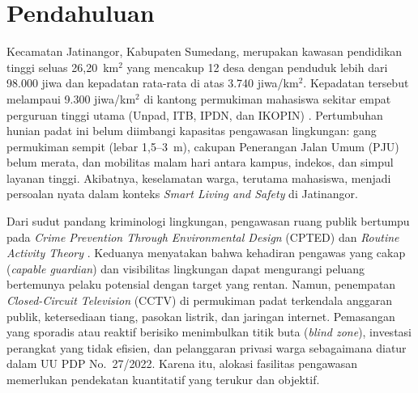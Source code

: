 \documentclass[10pt,twocolumn,a4paper]{article}
\begin{document}
\section{Pendahuluan}
Kecamatan Jatinangor, Kabupaten Sumedang, merupakan kawasan pendidikan tinggi seluas 26,20~km$^2$ yang mencakup 12 desa dengan penduduk lebih dari 98.000 jiwa dan kepadatan rata-rata di atas 3.740 jiwa/km$^2$. Kepadatan tersebut melampaui 9.300 jiwa/km$^2$ di kantong permukiman mahasiswa sekitar empat perguruan tinggi utama (Unpad, ITB, IPDN, dan IKOPIN) \cite{bps}. Pertumbuhan hunian padat ini belum diimbangi kapasitas pengawasan lingkungan: gang permukiman sempit (lebar 1,5--3~m), cakupan Penerangan Jalan Umum (PJU) belum merata, dan mobilitas malam hari antara kampus, indekos, dan simpul layanan tinggi. Akibatnya, keselamatan warga, terutama mahasiswa, menjadi persoalan nyata dalam konteks \textit{Smart Living and Safety} di Jatinangor.

Dari sudut pandang kriminologi lingkungan, pengawasan ruang publik bertumpu pada \textit{Crime Prevention Through Environmental Design} (CPTED) \cite{crowe} dan \textit{Routine Activity Theory} \cite{cohen}. Keduanya menyatakan bahwa kehadiran pengawas yang cakap (\textit{capable guardian}) dan visibilitas lingkungan dapat mengurangi peluang bertemunya pelaku potensial dengan target yang rentan. Namun, penempatan \textit{Closed-Circuit Television} (CCTV) di permukiman padat terkendala anggaran publik, ketersediaan tiang, pasokan listrik, dan jaringan internet. Pemasangan yang sporadis atau reaktif berisiko menimbulkan titik buta (\textit{blind zone}), investasi perangkat yang tidak efisien, dan pelanggaran privasi warga sebagaimana diatur dalam UU PDP No.~27/2022. Karena itu, alokasi fasilitas pengawasan memerlukan pendekatan kuantitatif yang terukur dan objektif.
\end{document}
